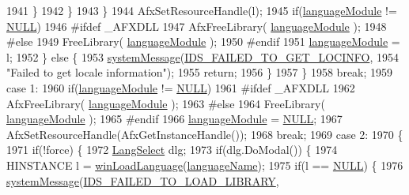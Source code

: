 \begin{DoxyCode}
{1941             \}
1942           \}
1943         \}
1944         AfxSetResourceHandle(l);
1945         \textcolor{keywordflow}{if}(\mbox{\hyperlink{class_v_b_a_ae4c01c2d55e31b9b29a850d22e691df8}{languageModule}} != \mbox{\hyperlink{getopt1_8c_a070d2ce7b6bb7e5c05602aa8c308d0c4}{NULL}})
1946 \textcolor{preprocessor}{#ifdef \_AFXDLL}
1947           AfxFreeLibrary( \mbox{\hyperlink{class_v_b_a_ae4c01c2d55e31b9b29a850d22e691df8}{languageModule}} );
1948 \textcolor{preprocessor}{#else}
1949           FreeLibrary( \mbox{\hyperlink{class_v_b_a_ae4c01c2d55e31b9b29a850d22e691df8}{languageModule}} );
1950 \textcolor{preprocessor}{#endif}
1951         \mbox{\hyperlink{class_v_b_a_ae4c01c2d55e31b9b29a850d22e691df8}{languageModule}} = l;
1952       \} \textcolor{keywordflow}{else} \{
1953         \mbox{\hyperlink{_v_b_a_8cpp_a2c709b1a3f26930ca4351d7516339436}{systemMessage}}(\mbox{\hyperlink{resource_8h_a2ec70aa44313f7ca3a3db744c3b2bda4}{IDS\_FAILED\_TO\_GET\_LOCINFO}},
1954                       \textcolor{stringliteral}{"Failed to get locale information"});
1955         \textcolor{keywordflow}{return};
1956       \}
1957     \}
1958     \textcolor{keywordflow}{break};
1959   \textcolor{keywordflow}{case} 1:
1960     \textcolor{keywordflow}{if}(\mbox{\hyperlink{class_v_b_a_ae4c01c2d55e31b9b29a850d22e691df8}{languageModule}} != \mbox{\hyperlink{getopt1_8c_a070d2ce7b6bb7e5c05602aa8c308d0c4}{NULL}})
1961 \textcolor{preprocessor}{#ifdef \_AFXDLL}
1962       AfxFreeLibrary( \mbox{\hyperlink{class_v_b_a_ae4c01c2d55e31b9b29a850d22e691df8}{languageModule}} );
1963 \textcolor{preprocessor}{#else}
1964       FreeLibrary( \mbox{\hyperlink{class_v_b_a_ae4c01c2d55e31b9b29a850d22e691df8}{languageModule}} );
1965 \textcolor{preprocessor}{#endif}
1966     \mbox{\hyperlink{class_v_b_a_ae4c01c2d55e31b9b29a850d22e691df8}{languageModule}} = \mbox{\hyperlink{getopt1_8c_a070d2ce7b6bb7e5c05602aa8c308d0c4}{NULL}};
1967     AfxSetResourceHandle(AfxGetInstanceHandle());
1968     \textcolor{keywordflow}{break};
1969   \textcolor{keywordflow}{case} 2:
1970     \{
1971       \textcolor{keywordflow}{if}(!force) \{
1972         \mbox{\hyperlink{class_lang_select}{LangSelect}} dlg;
1973         \textcolor{keywordflow}{if}(dlg.DoModal()) \{
1974           HINSTANCE l = \mbox{\hyperlink{class_v_b_a_abbf1f3cbda50fca40ddf50a6fafe8e05}{winLoadLanguage}}(\mbox{\hyperlink{class_v_b_a_a9763c257edcdac0bff2b0ecab70ffc80}{languageName}});
1975           \textcolor{keywordflow}{if}(l == \mbox{\hyperlink{getopt1_8c_a070d2ce7b6bb7e5c05602aa8c308d0c4}{NULL}}) \{
1976             \mbox{\hyperlink{_v_b_a_8cpp_a2c709b1a3f26930ca4351d7516339436}{systemMessage}}(\mbox{\hyperlink{resource_8h_a3477bed37b8399c34699d02891c6a3a7}{IDS\_FAILED\_TO\_LOAD\_LIBRARY}},
}
\end{DoxyCode}
